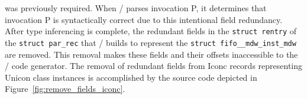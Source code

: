 \noindent
was previously required. When \Ic/ parses invocation P, it determines that
invocation P is syntactically correct due to this intentional field redundancy.
After type inferencing is complete, the redundant fields in
the \texttt{struct~rentry} of the \texttt{struct~par\_rec} that \Ic/ builds to
represent the \texttt{struct~fifo\_\_mdw\_inst\_mdw} are removed.
This removal makes these fields and their offsets inaccessible to the \Ic/
code generator.  The removal of redundant fields from Iconc records representing
Unicon class instances is accomplished by the source code depicted in
Figure~\ref{fig:remove_fields_iconc}.


